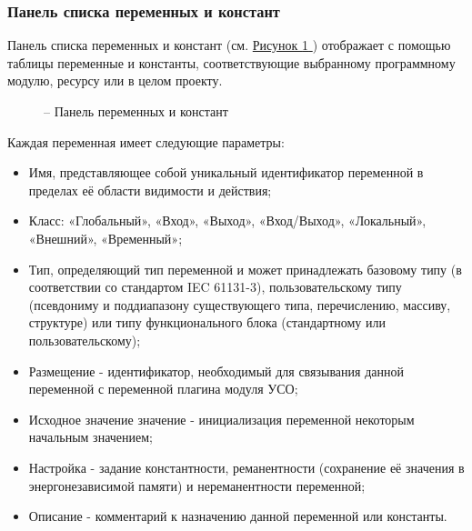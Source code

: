 \documentclass[letterpaper,10pt,russian]{sphinxmanual}
\begin{document}
\subsubsection{Панель списка переменных и констант}
\label{usage_guide/ide_components:id4}
Панель списка переменных и констант (см. \hyperref[usage_guide/ide_components:image32]{Рисунок \ref{usage_guide/ide_components:image32} }) отображает с помощью
таблицы переменные и константы, соответствующие выбранному программному
модулю, ресурсу или в целом проекту.
\begin{figure}[htbp]
\centering
\capstart

\noindent{}
\caption{– Панель переменных и констант}\label{usage_guide/ide_components:image32}\end{figure}

Каждая переменная имеет следующие параметры:
\begin{itemize}
\item {} 
Имя, представляющее собой уникальный идентификатор переменной в
пределах её области видимости и действия;

\item {} 
Класс: «Глобальный», «Вход», «Выход», «Вход/Выход», «Локальный»,
«Внешний», «Временный»;

\item {} 
Тип, определяющий тип переменной и может принадлежать базовому типу
(в соответствии со стандартом IEC 61131-3), пользовательскому типу
(псевдониму и поддиапазону существующего типа, перечислению, массиву,
структуре) или типу функционального блока (стандартному или
пользовательскому);

\item {} 
Размещение - идентификатор, необходимый для связывания данной
переменной с переменной плагина модуля УСО;

\item {} 
Исходное значение значение - инициализация переменной некоторым
начальным значением;

\item {} 
Настройка - задание константности, реманентности (сохранение её
значения в энергонезависимой памяти) и нереманентности переменной;

\item {} 
Описание - комментарий к назначению данной переменной или константы.

\end{itemize}
\end{document}
